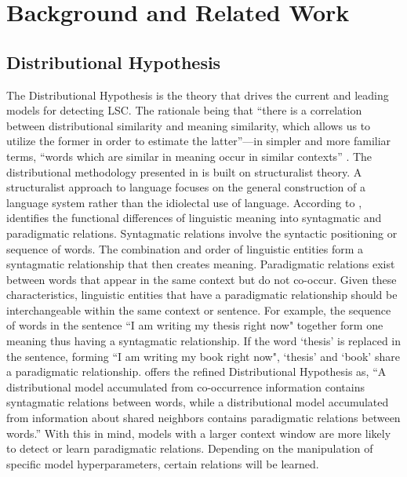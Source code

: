 \section{Background and Related Work}
\label{sec:background}

\subsection{Distributional Hypothesis}

The Distributional Hypothesis is the theory that drives the current and leading models for detecting LSC. The rationale being that “there is a correlation between distributional similarity and meaning similarity, which allows us to utilize the former in order to estimate the latter”—in simpler and more familiar terms, “words which are similar in meaning occur in similar contexts” \citep{sahlgren2008distributional}. The distributional methodology presented in \citet{harris1970distributional} is built on structuralist theory. A structuralist approach to language focuses on the general construction of a language system rather than the idiolectal use of language. According to \citet{sahlgren2008distributional}, \citet{saussure1916} identifies the functional differences of linguistic meaning into syntagmatic and paradigmatic relations. Syntagmatic relations involve the syntactic positioning or sequence of words. The combination and order of linguistic entities form a syntagmatic relationship that then creates meaning. Paradigmatic relations exist between words that appear in the same context but do not co-occur. Given these characteristics, linguistic entities that have a paradigmatic relationship should be interchangeable within the same context or sentence. For example, the sequence of words in the sentence ``I am writing my thesis right now" together form one meaning thus having a syntagmatic relationship. If the word `thesis' is replaced in the sentence, forming ``I am writing my book right now", `thesis' and `book' share a paradigmatic relationship. \citet{sahlgren2008distributional} offers the refined Distributional Hypothesis as, “A distributional model accumulated from co-occurrence information contains syntagmatic relations between words, while a distributional model accumulated from information about shared neighbors contains paradigmatic relations between words.” With this in mind, models with a larger context window are more likely to detect or learn paradigmatic relations. Depending on the manipulation of specific model hyperparameters, certain relations will be learned. 


